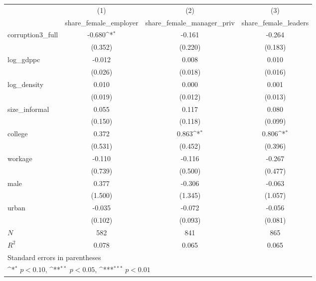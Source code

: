 {
\def\sym#1{\ifmmode^{#1}\else\(^{#1}\)\fi}
\begin{tabular}{l*{3}{c}}
\hline\hline
            &\multicolumn{1}{c}{(1)}&\multicolumn{1}{c}{(2)}&\multicolumn{1}{c}{(3)}\\
            &\multicolumn{1}{c}{share\_female\_employer}&\multicolumn{1}{c}{share\_female\_manager\_priv}&\multicolumn{1}{c}{share\_female\_leaders}\\
\hline
corruption3\_full&      -0.680\sym{*}  &      -0.161         &      -0.264         \\
            &     (0.352)         &     (0.220)         &     (0.183)         \\
[1em]
log\_gdppc   &      -0.012         &       0.008         &       0.010         \\
            &     (0.026)         &     (0.018)         &     (0.016)         \\
[1em]
log\_density &       0.010         &       0.000         &       0.001         \\
            &     (0.019)         &     (0.012)         &     (0.013)         \\
[1em]
size\_informal&       0.055         &       0.117         &       0.080         \\
            &     (0.150)         &     (0.118)         &     (0.099)         \\
[1em]
college     &       0.372         &       0.863\sym{*}  &       0.806\sym{*}  \\
            &     (0.531)         &     (0.452)         &     (0.396)         \\
[1em]
workage     &      -0.110         &      -0.116         &      -0.267         \\
            &     (0.739)         &     (0.500)         &     (0.477)         \\
[1em]
male        &       0.377         &      -0.306         &      -0.063         \\
            &     (1.500)         &     (1.345)         &     (1.057)         \\
[1em]
urban       &      -0.035         &      -0.072         &      -0.056         \\
            &     (0.102)         &     (0.093)         &     (0.081)         \\
\hline
\(N\)       &         582         &         841         &         865         \\
\(R^{2}\)   &       0.078         &       0.065         &       0.065         \\
\hline\hline
\multicolumn{4}{l}{\footnotesize Standard errors in parentheses}\\
\multicolumn{4}{l}{\footnotesize \sym{*} \(p<0.10\), \sym{**} \(p<0.05\), \sym{***} \(p<0.01\)}\\
\end{tabular}
}
